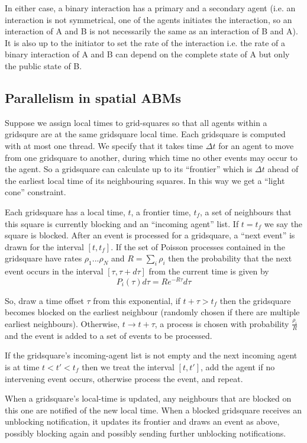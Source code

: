 \documentclass[a4paper]{article}
\begin{document}
In either case, a binary interaction has a primary and a secondary agent (i.e. an interaction is not symmetrical, one of the agents initiates the interaction, so an interaction of A and B is not necessarily the same as an interaction of B and A). It is also up to the initiator to set the rate of the interaction i.e. the rate of a binary interaction of A and B can depend on the complete state of A but only the public state of B.

\subsection{Parallelism in spatial ABMs}

Suppose we assign local times to grid-squares so that all agents within a gridsqure are at the same gridsquare local time. Each gridsquare is computed with at most one thread. We specify that it takes time $\Delta t$ for an agent to move from one gridsquare to another, during which time no other events may occur to the agent. So a gridsquare can calculate up to its ``frontier'' which is $\Delta t$ ahead of the earliest local time of its neighbouring squares. In this way we get a ``light cone'' constraint.

Each gridsquare has a local time, $t$, a frontier time, $t_f$, a set of neighbours that this square is currently blocking and an ``incoming agent'' list. If $t=t_f$ we say the square is blocked. After an event is processed for a gridsquare, a ``next event'' is drawn for the interval $[t,t_f]$. If the set of Poisson processes contained in the gridsquare have rates $\rho_1...\rho_N$ and $R = \sum_i \rho_i$ then the probability that the next event occurs in the interval $[\tau, \tau+d\tau]$ from the current time is given by
\[
P_i(\tau)d\tau = Re^{-R\tau}d\tau
\]

So, draw a time offset $\tau$ from this exponential, if $t + \tau > t_f$ then the gridsquare becomes blocked on the earliest neighbour (randomly chosen if there are multiple earliest neighbours). Otherwise, $t \to t + \tau$, a process is chosen with probability $\frac{\rho_i}{R}$ and the event is added to a set of events to be processed.

If the gridsquare's incoming-agent list is not empty and the next incoming agent is at time  $t < t' < t_f$ then we treat the interval $[t, t']$, add the agent if no intervening event occurs, otherwise process the event, and repeat.

When a gridsquare's local-time is updated, any neighbours that are blocked on this one are notified of the new local time. When a blocked gridsquare receives an unblocking notification, it updates its frontier and draws an event as above, possibly blocking again and possibly sending further unblocking notifications.
\end{document}
